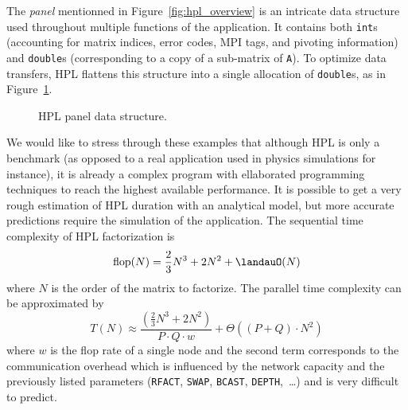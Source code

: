         The \emph{panel} mentionned in Figure~\ref{fig:hpl_overview} is an intricate data structure used throughout
        multiple functions of the application.  It contains both \texttt{int}s (accounting for matrix indices, error
        codes, MPI tags, and pivoting information) and \texttt{double}s (corresponding to a copy of a sub-matrix of
        \texttt{A}). To optimize data transfers, HPL flattens this structure into a single allocation of
        \texttt{double}s, as in Figure~\ref{fig:hpl_panel_sourcecode}.
        \begin{figure}[htpb]
            \centering
            \lstset{frame=bt,language=C,numbers=none}
            \caption{HPL panel data structure.}%
            \label{fig:hpl_panel_sourcecode}
        \end{figure}

        We would like to stress through these examples that although HPL is only a benchmark (as opposed to a real
        application used in physics simulations for instance), it is already a complex program with ellaborated
        programming techniques to reach the highest available performance.  It is possible to get a very rough
        estimation of HPL duration with an analytical model, but more accurate predictions require the simulation of the
        application. The sequential time complexity of HPL factorization is \[\mathrm{flop}(N) = \frac{2}{3}N^3 + 2N^2 +
        \landauO(N)\] where $N$ is the order of the matrix to factorize.  The parallel time complexity can be
        approximated by \[T(N) \approx \frac{\left(\frac{2}{3}N^3 + 2N^2\right)}{P\cdot{}Q\cdot{}w} +
        \Theta((P+Q)\cdot{}N^2)\] where $w$ is the flop rate of a single node and the second term corresponds to the
        communication overhead which is influenced by the network capacity and the previously listed parameters
        (\texttt{RFACT}, \texttt{SWAP}, \texttt{BCAST}, \texttt{DEPTH}, \ldots) and is very difficult to predict.

